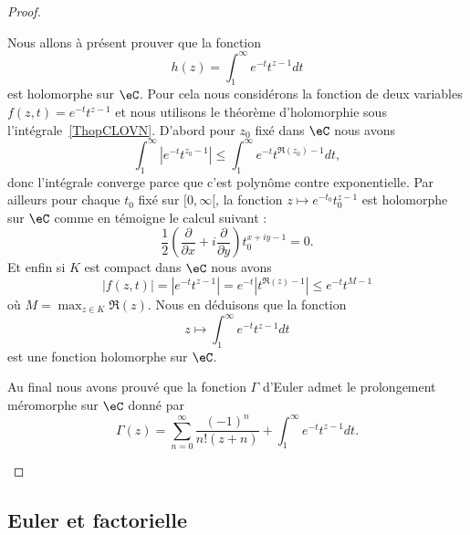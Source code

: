 \begin{proof}
\begin{subproof}
		Nous allons à présent prouver que la fonction
		\begin{equation}
			h(z)=\int_1^{\infty} e^{-t}t^{z-1}dt
		\end{equation}
		est holomorphe sur \( \eC\). Pour cela nous considérons la fonction de deux variables \( f(z,t)= e^{-t}t^{z-1}\) et nous utilisons le théorème d'holomorphie sous l'intégrale~\ref{ThopCLOVN}. D'abord pour \( z_0\) fixé dans \( \eC\) nous avons
		\begin{equation}
			\int_1^{\infty}|  e^{-t}t^{z_0-1} |\leq \int_1^{\infty} e^{-t}t^{\Re(z_0)-1}dt,
		\end{equation}
		donc l'intégrale converge parce que c'est polynôme contre exponentielle. Par ailleurs pour chaque \( t_0\) fixé sur \( \mathopen[ 0 , \infty [\), la fonction \( z\mapsto  e^{-t_0}t_0^{z-1}\) est holomorphe sur \( \eC\) comme en témoigne le calcul suivant :
		\begin{equation}
			\frac{ 1 }{2}\left( \frac{ \partial  }{ \partial x }+i\frac{ \partial  }{ \partial y } \right)t_0^{x+iy-1}=0.
		\end{equation}
		Et enfin si \( K\) est compact dans \( \eC\) nous avons
		\begin{equation}
			| f(z,t) |=|  e^{-t}t^{z-1} |= e^{-t}| t^{\Re(z)-1} |\leq  e^{-t}t^{M-1}
		\end{equation}
		où \( M=\max_{z\in K}\Re(z)\). Nous en déduisons que la fonction
		\begin{equation}
			z\mapsto\int_1^{\infty} e^{-t}t^{z-1}dt
		\end{equation}
		est une fonction holomorphe sur \( \eC\).

		\spitem[Conclusion]

		Au final nous avons prouvé que la fonction \( \Gamma\) d'Euler admet le prolongement méromorphe sur \( \eC\) donné par
		\begin{equation}
			\Gamma(z)=\sum_{n=0}^{\infty}\frac{ (-1)^n }{ n!(z+n) }+\int_1^{\infty} e^{-t}t^{z-1}dt.
		\end{equation}
	\end{subproof}
\end{proof}

\subsection{Euler et factorielle}

